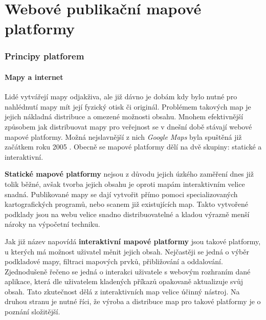 \newpage

\part{Webové publikační mapové platformy}
\newpage
\section{Principy platforem}

\subsection{Mapy a internet}

Lidé vytvářejí mapy odjakživa, ale již dávno je dobám kdy bylo nutné
pro nahlédnutí mapy mít její fyzický otisk či originál. Problémem
takových map je jejich nákladná distribuce a omezené možnosti
obsahu. Mnohem efektivnější způsobem jak distribuovat mapy pro
veřejnost se v dnešní době stávají webové mapové platformy. Možná
nejslavnější z nich \textit{Google Maps} byla spuštěná již začátkem
roku 2005 \cite{google_history}.  Obecně se mapové platformy dělí na
dvě skupiny: statické a interaktivní.

\textbf{Statické mapové platformy} nejsou z důvodu jejich úzkého
zaměření dnes již tolik běžné, avšak tvorba jejich obsahu je oproti
mapám interaktivním velice snadná. Publikované mapy se dají vytvořit
přímo pomoci specializovaných kartografických programů, nebo scanem
již existujících map. Takto vytvořené podklady jsou na webu velice
snadno distribuovatelné a kladou výrazně menší nároky na výpočetní
techniku.

Jak již název napovídá \textbf{interaktivní mapové platformy} jsou
takové platformy, u kterých má možnost uživatel měnit jejich
obsah. Nejčastěji se jedná o výběr podkladové mapy, filtraci mapových
prvků, přibližování a oddalování. Zjednodušeně řečeno se jedná o
interakci uživatele s webovým rozhraním dané aplikace, která dle
uživatelem kladených příkazů opakovaně aktualizuje svůj
obsah\cite{web_mapping}. Tato zkutečnost dělá z interaktivních map
velice účinný nástroj. Na druhou stranu je nutné říci, že výroba a
distribuce map pro takové platformy je o poznání složitější.


